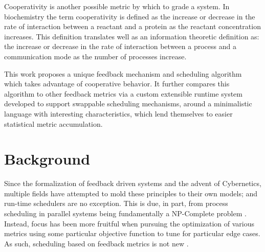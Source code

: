 Cooperativity is another possible metric by which to grade a system. In biochemistry the term cooperativity
is defined as the increase or decrease in the rate of interaction between a reactant and a protein as
the reactant concentration increases. This definition translates well as an information theoretic definition
as: the increase or decrease in the rate of interaction between a process and a communication mode as the
number of processes increase. 

This work proposes a unique feedback mechanism and scheduling algorithm which takes advantage of cooperative behavior.
It further compares this algorithm to other feedback metrics via a custom extensible runtime system developed to
support swappable scheduling mechanisms, around a minimalistic language with interesting characteristics, which 
lend themselves to easier statistical metric accumulation.
\vfill{}

\setcounter{page}{0} 
\newpage{}

\section{Background} %

Since the formalization of feedback driven systems and the advent of Cybernetics, multiple fields have attempted 
to mold these principles to their own models; and run-time schedulers are no exception. This is due, in part, from
process scheduling in parallel systems being fundamentally a NP-Complete problem \cite{bruno1976computer}. Instead,
focus has been more fruitful when pursuing the optimization of various metrics using some particular objective 
function \cite{garey1978performance} to tune for particular edge cases. As such, scheduling based on feedback 
metrics is not new \cite{dietz1997use}.

